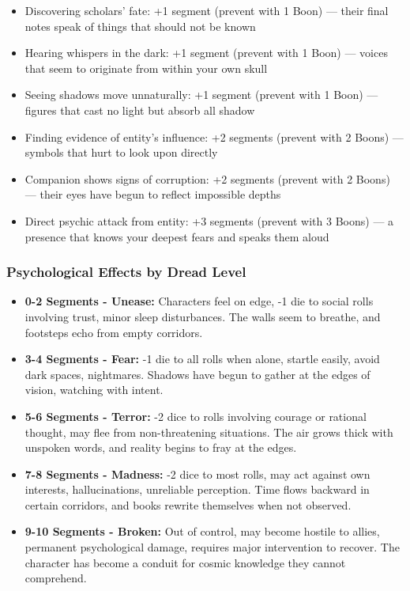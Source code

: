 \documentclass[11pt]{article}
\begin{document}
\begin{itemize}
\item Discovering scholars' fate: +1 segment (prevent with 1 Boon) — their final notes speak of things that should not be known
\item Hearing whispers in the dark: +1 segment (prevent with 1 Boon) — voices that seem to originate from within your own skull
\item Seeing shadows move unnaturally: +1 segment (prevent with 1 Boon) — figures that cast no light but absorb all shadow
\item Finding evidence of entity's influence: +2 segments (prevent with 2 Boons) — symbols that hurt to look upon directly
\item Companion shows signs of corruption: +2 segments (prevent with 2 Boons) — their eyes have begun to reflect impossible depths
\item Direct psychic attack from entity: +3 segments (prevent with 3 Boons) — a presence that knows your deepest fears and speaks them aloud
\end{itemize}

\subsubsection{Psychological Effects by Dread Level}

\begin{itemize}
\item \textbf{0-2 Segments - Unease:} Characters feel on edge, -1 die to social rolls involving trust, minor sleep disturbances. The walls seem to breathe, and footsteps echo from empty corridors.
\item \textbf{3-4 Segments - Fear:} -1 die to all rolls when alone, startle easily, avoid dark spaces, nightmares. Shadows have begun to gather at the edges of vision, watching with intent.
\item \textbf{5-6 Segments - Terror:} -2 dice to rolls involving courage or rational thought, may flee from non-threatening situations. The air grows thick with unspoken words, and reality begins to fray at the edges.
\item \textbf{7-8 Segments - Madness:} -2 dice to most rolls, may act against own interests, hallucinations, unreliable perception. Time flows backward in certain corridors, and books rewrite themselves when not observed.
\item \textbf{9-10 Segments - Broken:} Out of control, may become hostile to allies, permanent psychological damage, requires major intervention to recover. The character has become a conduit for cosmic knowledge they cannot comprehend.
\end{itemize}
\end{document}
